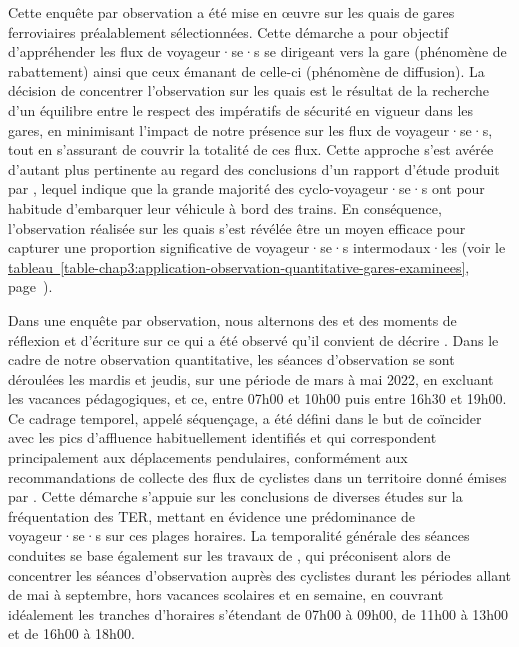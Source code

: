\begin{refsegment}
Cette enquête par observation a été mise en œuvre sur les quais de gares ferroviaires préalablement sélectionnées. Cette démarche a pour objectif d'appréhender les flux de voyageur·se·s se dirigeant vers la gare (phénomène de rabattement) ainsi que ceux émanant de celle-ci (phénomène de diffusion). La décision de concentrer l'observation sur les quais est le résultat de la recherche d'un équilibre entre le respect des impératifs de sécurité en vigueur dans les gares, en minimisant l'impact de notre présence sur les flux de voyageur·se·s, tout en s'assurant de couvrir la totalité de ces flux. Cette approche s'est avérée d'autant plus pertinente au regard des conclusions d'un rapport d'étude produit par \textcolor{blue}{\textcite[13]{enov_enquete_2021}}, lequel indique que la grande majorité des cyclo-voyageur·se·s ont pour habitude d'embarquer leur véhicule à bord des trains. En conséquence, l'observation réalisée sur les quais s'est révélée être un moyen efficace pour capturer une proportion significative de voyageur·se·s intermodaux·les (voir le \hyperref[table-chap3:application-observation-quantitative-gares-examinees]{tableau~\ref{table-chap3:application-observation-quantitative-gares-examinees}}, page~\pageref{table-chap3:application-observation-quantitative-gares-examinees}).%


Dans une enquête par observation, nous alternons des  et des moments de réflexion et d’écriture sur ce qui a été observé qu'il convient de décrire \textcolor{blue}{\autocite[15]{revillard_observation_2018}}. Dans le cadre de notre observation quantitative, les séances d'observation se sont déroulées les mardis et jeudis, sur une période de mars à mai 2022, en excluant les vacances pédagogiques, et ce, entre 07h00 et 10h00 puis entre 16h30 et 19h00. Ce cadrage temporel, appelé séquençage, a été défini dans le but de coïncider avec les pics d'affluence habituellement identifiés et qui correspondent principalement aux déplacements pendulaires, conformément aux recommandations de collecte des flux de cyclistes dans un territoire donné émises par \textcolor{blue}{\textcite[20]{johnstone_collecting_2017}}. Cette démarche s'appuie sur les conclusions de diverses études sur la fréquentation des \acrshort{TER}, mettant en évidence une prédominance de voyageur·se·s sur ces plages horaires. La temporalité générale des séances conduites se base également sur les travaux de \textcolor{blue}{\textcite[20]{johnstone_collecting_2017}}, qui préconisent alors de concentrer les séances d'observation auprès des cyclistes durant les périodes allant de mai à septembre, hors vacances scolaires et en semaine, en couvrant idéalement les tranches d'horaires s'étendant de 07h00 à 09h00, de 11h00 à 13h00 et de 16h00 à 18h00.%


\end{refsegment}
